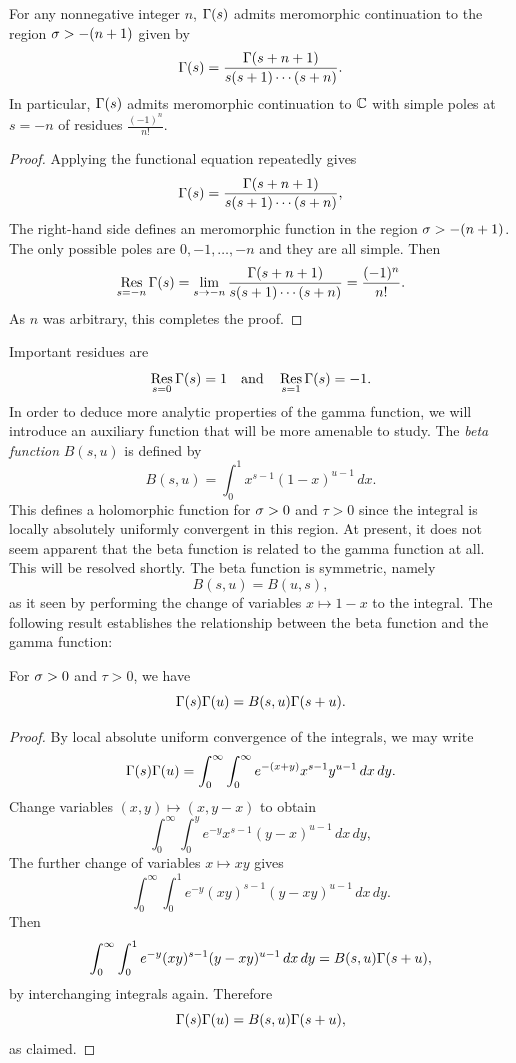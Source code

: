 \documentclass[12pt]{article}
\begin{document}
    \begin{theorem}\label{thm:continuation_of_gamma_function}
      For any nonnegative integer \(n\), \(\Gamma(s)\) admits meromorphic continuation to the region \(\sigma > -(n+1)\) given by
      \[
        \Gamma(s) = \frac{\Gamma(s+n+1)}{s(s+1) \cdots (s+n)}.
      \]
      In particular, \(\Gamma(s)\) admits meromorphic continuation to \(\mathbb{C}\) with simple poles at \(s = -n\) of residues \(\frac{(-1)^{n}}{n!}\).
    \end{theorem}
    \begin{proof}
      Applying the functional equation repeatedly gives
      \[
        \Gamma(s) = \frac{\Gamma(s+n+1)}{s(s+1) \cdots (s+n)},
      \]
      The right-hand side defines an meromorphic function in the region \(\sigma > -(n+1)\). The only possible poles are \(0,-1,\ldots,-n\) and they are all simple. Then
      \[
        \operatorname*{\mathrm{Res}}_{s = -n}\Gamma(s) = \lim_{s \to -n}\frac{\Gamma(s+n+1)}{s(s+1) \cdots (s+n)} = \frac{(-1)^{n}}{n!}. 
      \]
      As \(n\) was arbitrary, this completes the proof.
    \end{proof}

    Important residues are
    \[
      \operatorname*{\mathrm{Res}}_{s = 0}\Gamma(s) = 1 \quad \text{and} \quad \operatorname*{\mathrm{Res}}_{s = 1}\Gamma(s) = -1.
    \]
    In order to deduce more analytic properties of the gamma function, we will introduce an auxiliary function that will be more amenable to study. The \textit{beta function} \(B(s,u)\) is defined by
    \[
        B(s,u) = \int_{0}^{1}x^{s-1}(1-x)^{u-1}\,dx.
    \]
    This defines a holomorphic function for \(\sigma > 0\) and \(\tau > 0\) since the integral is locally absolutely uniformly convergent in this region. At present, it does not seem apparent that the beta function is related to the gamma function at all. This will be resolved shortly. The beta function is symmetric, namely
    \[
        B(s,u) = B(u,s),
    \]
    as it seen by performing the change of variables \(x \mapsto 1-x\) to the integral. The following result establishes the relationship between the beta function and the gamma function:
    
    \begin{proposition}\label{prop:integral_reprepsentation_for_beta_function}
      For \(\sigma > 0\) and \(\tau > 0\), we have
      \[
        \Gamma(s)\Gamma(u) = B(s,u)\Gamma(s+u).
      \]
    \end{proposition}
    \begin{proof}
      By local absolute uniform convergence of the integrals, we may write
      \[
        \Gamma(s)\Gamma(u) = \int_{0}^{\infty}\int_{0}^{\infty}e^{-(x+y)}x^{s-1}y^{u-1}\,dx\,dy.
      \]
      Change variables \((x,y) \mapsto (x,y-x)\) to obtain
      \[
        \int_{0}^{\infty}\int_{0}^{y}e^{-y}x^{s-1}(y-x)^{u-1}\,dx\,dy,
      \]
      The further change of variables \(x \mapsto xy\) gives
      \[
        \int_{0}^{\infty}\int_{0}^{1}e^{-y}(xy)^{s-1}(y-xy)^{u-1}\,dx\,dy.
      \]
      Then
      \[
        \int_{0}^{\infty}\int_{0}^{1}e^{-y}(xy)^{s-1}(y-xy)^{u-1}\,dx\,dy = B(s,u)\Gamma(s+u),
      \]
      by interchanging integrals again. Therefore
      \[
        \Gamma(s)\Gamma(u) = B(s,u)\Gamma(s+u),
      \]
      as claimed.
    \end{proof}
\end{document}
